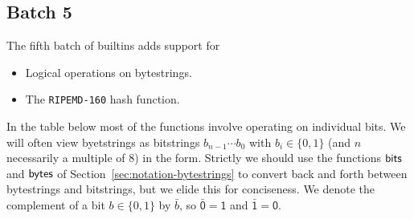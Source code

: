 \renewcommand{\note}[1]{
  \bigskip
  \refstepcounter{notenumberE}
  \noindent\textbf{Note \thenotenumberE. #1}
}

\newcommand\Xand{\mathsf{and}}
\newcommand\Xor{\mathsf{or}}
\newcommand\Xxor{\mathsf{xor}}
\newcommand{\extzero}[1]{\mathtt{0}^*{\cdot}#1}
\newcommand{\extone}[1]{\mathtt{1}^*{\cdot}#1}

\subsection{Batch 5}
\label{sec:default-builtins-5}
The fifth batch of builtins adds support for
\begin{itemize}
\item Logical operations on bytestrings.
\item The \texttt{RIPEMD-160} hash function.
\end{itemize}

\noindent In the table below most of the functions involve operating on individual bits.
We will often view byetstrings as bitstrings $b_{n-1}\cdots b_0$ with
$b_i \in \{0,1\}$ (and $n$ necessarily a multiple of 8) in the form.  Strictly
we should use the functions $\mathsf{bits}$ and $\mathsf{bytes}$ of
Section~\ref{sec:notation-bytestrings} to convert back and forth between
bytestrings and bitstrings, but we elide this for conciseness.  We denote the
complement of a bit $b \in \{0,1\}$ by $\bar{b}$, so $\bar{\textsf{0}}
= \textsf{1}$ and $\bar{\textsf{1}} = \textsf{0}$.


